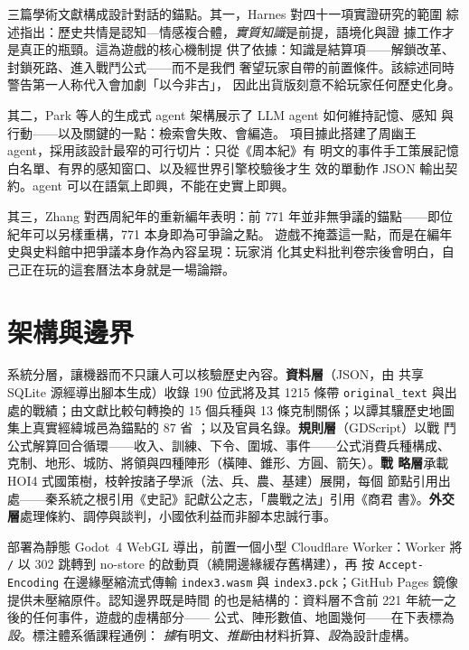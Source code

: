 \documentclass[12pt,a4paper]{article}
\begin{document}
三篇學術文獻構成設計對話的錨點。其一，Harnes 對四十一項實證研究的範圍
綜述指出：歷史共情是認知—情感複合體，\emph{實質知識}是前提，語境化與證
據工作才是真正的瓶頸\autocite{harnes2025empathy}。這為遊戲的核心機制提
供了依據：知識是結算項——解鎖改革、封鎖死路、進入戰鬥公式——而不是我們
奢望玩家自帶的前置條件。該綜述同時警告第一人称代入會加劇「以今非古」，
因此出貨版刻意不給玩家任何歷史化身。

其二，Park 等人的生成式 agent 架構展示了 LLM agent 如何維持記憶、感知
與行動——以及關鍵的一點：檢索會失敗、會編造\autocite{park2023generative}。
項目據此搭建了周幽王 agent，採用該設計最窄的可行切片：只從《周本紀》有
明文的事件手工策展記憶白名單、有界的感知窗口、以及經世界引擎校驗後才生
效的單動作 JSON 輸出契約。agent 可以在語氣上即興，不能在史實上即興。

其三，Zhang 對西周紀年的重新編年表明：前 771 年並非無爭議的錨點——即位
紀年可以另樣重構，771 本身即為可爭論之點\autocite{zhang2023chronology}。
遊戲不掩蓋這一點，而是在編年史與史料館中把爭議本身作為內容呈現：玩家消
化其史料批判卷宗後會明白，自己正在玩的這套曆法本身就是一場論辯。

\section{架構與邊界}

系統分層，讓機器而不只讓人可以核驗歷史內容。\textbf{資料層}（JSON，由
共享 SQLite 源經導出腳本生成）收錄 190 位武將及其 1215 條帶
\texttt{original\_text} 與出處的戰績；由文獻比較句轉換的 15 個兵種與 13
條克制關係；以譚其驤歷史地圖集上真實經緯城邑為錨點的 87 省
\autocite{tan1982atlas}；以及官員名錄。\textbf{規則層}（GDScript）以戰
鬥公式解算回合循環——收入、訓練、下令、圍城、事件——公式消費兵種構成、
克制、地形、城防、將領與四種陣形（橫陣、錐形、方圓、箭矢）。\textbf{戰
略層}承載 HOI4 式國策樹，枝幹按諸子學派（法、兵、農、基建）展開，每個
節點引用出處——秦系統之根引用《史記》記獻公之志，「農戰之法」引用《商君
書》。\textbf{外交層}處理條約、調停與談判，小國依利益而非腳本忠誠行事。

部署為靜態 Godot~4 WebGL 導出，前置一個小型 Cloudflare Worker：Worker
將 \texttt{/} 以 302 跳轉到 no-store 的啟動頁（繞開邊緣緩存舊構建），再
按 \texttt{Accept-Encoding} 在邊緣壓縮流式傳輸 \texttt{index3.wasm} 與
\texttt{index3.pck}；GitHub Pages 鏡像提供未壓縮原件。認知邊界既是時間
的也是結構的：資料層不含前 221 年統一之後的任何事件，遊戲的虛構部分——
公式、陣形數值、地圖幾何——在下表標為\emph{設}。標注體系循課程通例：
\emph{據}有明文、\emph{推斷}由材料折算、\emph{設}為設計虛構。
\end{document}

